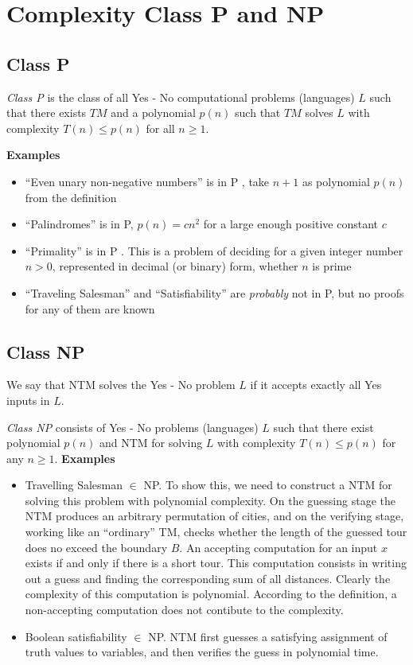 \section{Complexity Class P and NP}
\subsection{Class P}
\begin{definition}
    \textit{Class P} is the class of all Yes - No computational problems
    (languages) $L$ such that there exists $TM$ and a polynomial $p(n)$ such that
    $TM$ solves $L$ with complexity $T(n) \leq p(n)$ for all $n \geq 1$.
\end{definition}
\textbf{Examples}
\begin{itemize}
    \item “Even unary non-negative numbers” is in P , take $n + 1$ as polynomial $p(n)$ from the definition
    \item “Palindromes” is in P, $p(n) = cn^2$ for a large enough positive constant $c$
    \item “Primality” is in P . This is a problem of deciding for a given integer number $n > 0$,
        represented in decimal (or binary) form, whether $n$ is prime
    \item “Traveling Salesman” and “Satisfiability” are \textit{probably} not in P, but no proofs for any of them are known
\end{itemize}

\subsection{Class NP}
We say that NTM solves the Yes - No problem $L$ if it accepts exactly all Yes inputs in $L$.
\begin{definition}
    \textit{Class NP} consists of Yes - No problems (languages) $L$ such that
    there exist polynomial $p(n)$ and NTM for solving $L$ with complexity $T(n) \leq p(n)$ for any $n \geq 1$.
    \textbf{Examples}
    \begin{itemize}
        \item Travelling Salesman $\in$ NP.
            To show this, we need to construct a NTM for solving this problem with polynomial complexity.
            On the guessing stage the NTM produces an arbitrary permutation of cities,
            and on the verifying stage, working like an “ordinary” TM,
            checks whether the length of the guessed tour does no exceed the boundary $B$.
            An accepting computation for an input $x$ exists if and only if there is a short tour.
            This computation consists in writing out a guess and finding the corresponding sum of all distances.
            Clearly the complexity of this computation is polynomial.
            According to the definition, a non-accepting computation does not contibute to the complexity.
        \item Boolean satisfiability $\in$ NP.
            NTM first guesses a satisfying assignment of truth values to variables,
            and then verifies the guess in polynomial time.
    \end{itemize}
\end{definition}

